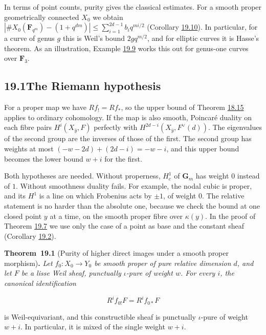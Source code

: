 \documentclass[11pt]{article}
\newenvironment{bpstatement}[2]{\par\addvspace{0.6\baselineskip}\noindent\textbf{#1}#2\textbf{.}\enspace\ignorespaces}
  {\par\addvspace{0.4\baselineskip}}
\newenvironment{bpstatementit}[2]{\begin{bpstatement}{#1}{#2}\itshape\ignorespaces}{\end{bpstatement}}
\begin{document}
In terms of point counts, purity gives the classical estimates. For a smooth proper geometrically connected \(X_0\) we obtain \(|\#X_0(\mathbf F_{q^m})-(1+q^{dm})|\le\sum_{i=1}^{2d-1}b_iq^{mi/2}\) (Corollary \hyperref[bp348]{19.10}). In particular, for a curve of genus \(g\) this is Weil's bound \(2gq^{m/2}\), and for elliptic curves it is Hasse's theorem. As an illustration, Example \hyperref[bp346]{19.9} works this out for genus-one curves over \(\mathbf F_3\).

\subsection*{\texorpdfstring{19.1\quad The Riemann hypothesis}{19.1 The Riemann hypothesis}}
\label{bp321}%
\label{bp322}%
For a proper map we have \(Rf_!=Rf_*\), so the upper bound of Theorem \hyperref[bp315]{18.15} applies to ordinary cohomology. If the map is also smooth, Poincaré duality on each fibre pairs \(H^i(X_{\bar y},F)\) perfectly with \(H^{2d-i}(X_{\bar y},F^\vee(d))\). The eigenvalues of the second group are the inverses of those of the first. The second group has weights at most \((-w-2d)+(2d-i)=-w-i\), and this upper bound becomes the lower bound \(w+i\) for the first.

Both hypotheses are needed. Without properness, \(H^1_c\) of \(\mathbf G_m\) has weight \(0\) instead of \(1\). Without smoothness duality fails. For example, the nodal cubic is proper, and its \(H^1\) is a line on which Frobenius acts by \(\pm1\), of weight \(0\). The relative statement is no harder than the absolute one, because we check the bound at one closed point \(y\) at a time, on the smooth proper fibre over \(\kappa(y)\). In the proof of Theorem \hyperref[bp342]{19.7} we use only the case of a point as base and the constant sheaf (Corollary \hyperref[bp326]{19.2}).

\label{bp323}%
\begin{bpstatementit}{Theorem~19.1}{ (Purity of higher direct images under a smooth proper morphism)}
Let \(f_0:X_0\to Y_0\) be smooth proper of pure relative dimension \(d\), and let \(F\) be a lisse Weil sheaf, punctually \(\iota\)-pure of weight \(w\). For every \(i\), the canonical identification

\[
R^if_{0!}F=R^if_{0*}F
\]

is Weil-equivariant, and this constructible sheaf is punctually \(\iota\)-pure of weight \(w+i\). In particular, it is mixed of the single weight \(w+i\).
\end{bpstatementit}
\end{document}
